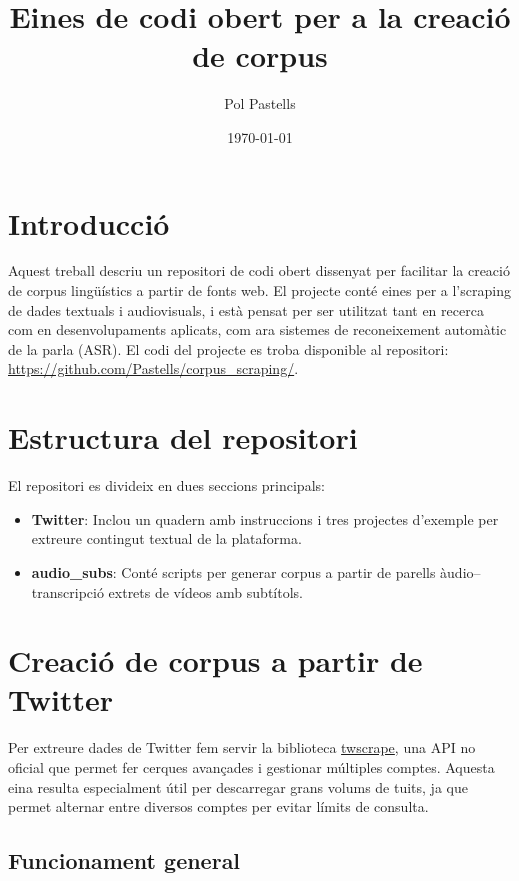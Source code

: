 \documentclass[11pt,a4paper]{article}
\title{Eines de codi obert per a la creació de corpus}
\author{Pol Pastells}
\date{\today}
\begin{document}
\maketitle

\section{Introducció}

Aquest treball descriu un repositori de codi obert dissenyat per facilitar la creació de corpus lingüístics a partir de fonts web. El projecte conté eines per a l'scraping de dades textuals i audiovisuals, i està pensat per ser utilitzat tant en recerca com en desenvolupaments aplicats, com ara sistemes de reconeixement automàtic de la parla (ASR).
El codi del projecte es troba disponible al repositori: \url{https://github.com/Pastells/corpus_scraping/}.


\section{Estructura del repositori}

El repositori es divideix en dues seccions principals:

\begin{itemize}
    \item \textbf{Twitter}: Inclou un quadern amb instruccions i tres projectes d'exemple per extreure contingut textual de la plataforma.
    \item \textbf{audio\_subs}: Conté scripts per generar corpus a partir de parells àudio--transcripció extrets de vídeos amb subtítols.
\end{itemize}

\section{Creació de corpus a partir de Twitter}

Per extreure dades de Twitter fem servir la biblioteca \href{https://github.com/vladkens/twscrape}{twscrape}, una API no oficial que permet fer cerques avançades i gestionar múltiples comptes. Aquesta eina resulta especialment útil per descarregar grans volums de tuits, ja que permet alternar entre diversos comptes per evitar límits de consulta.

\subsection{Funcionament general}
\end{document}
